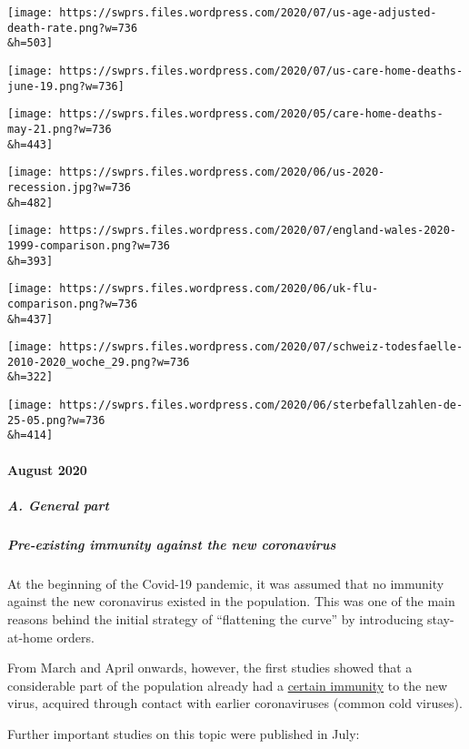 \texttt{[image: https://swprs.files.wordpress.com/2020/07/us-age-adjusted-death-rate.png?w=736\\\&h=503]}

\texttt{[image: https://swprs.files.wordpress.com/2020/07/us-care-home-deaths-june-19.png?w=736]}

\texttt{[image: https://swprs.files.wordpress.com/2020/05/care-home-deaths-may-21.png?w=736\\\&h=443]}

\texttt{[image: https://swprs.files.wordpress.com/2020/06/us-2020-recession.jpg?w=736\\\&h=482]}

\texttt{[image: https://swprs.files.wordpress.com/2020/07/england-wales-2020-1999-comparison.png?w=736\\\&h=393]}

\texttt{[image: https://swprs.files.wordpress.com/2020/06/uk-flu-comparison.png?w=736\\\&h=437]}

\texttt{[image: https://swprs.files.wordpress.com/2020/07/schweiz-todesfaelle-2010-2020\_woche\_29.png?w=736\\\&h=322]}

\texttt{[image: https://swprs.files.wordpress.com/2020/06/sterbefallzahlen-de-25-05.png?w=736\\\&h=414]}

\hypertarget{august-2020}{%
\paragraph{August 2020}\label{august-2020}}

\hypertarget{a-general-part}{%
\subparagraph{A. General part}\label{a-general-part}}

\hypertarget{pre-existing-immunity-against-the-new-coronavirus}{%
\subparagraph{\texorpdfstring{\textbf{Pre-existing immunity against the
new
coronavirus}}{Pre-existing immunity against the new coronavirus}}\label{pre-existing-immunity-against-the-new-coronavirus}}

At the beginning of the Covid-19 pandemic, it was assumed that no
immunity against the new coronavirus existed in the population. This was
one of the main reasons behind the initial strategy of ``flattening the
curve'' by introducing stay-at-home orders.

From March and April onwards, however, the first studies showed that a
considerable part of the population already had a
\href{https://www.cell.com/cell/fulltext/S0092-8674(20)30610-3}{certain
immunity} to the new virus, acquired through contact with earlier
coronaviruses (common cold viruses).

Further important studies on this topic were published in July:

